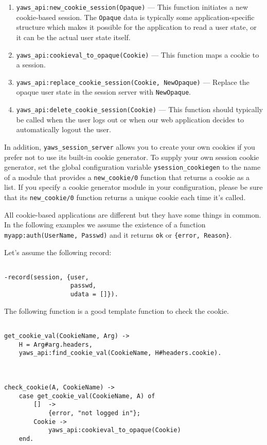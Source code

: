 \documentclass[11pt,oneside,english]{book}
\begin{document}
\begin{enumerate}
\item \verb+yaws_api:new_cookie_session(Opaque)+ --- This function
  initiates a new cookie-based session. The \verb+Opaque+ data is
  typically some application-specific structure which makes it
  possible for the application to read a user state, or it can be the
  actual user state itself.

\item \verb+yaws_api:cookieval_to_opaque(Cookie)+ --- This function
  maps a cookie to a session.

\item \verb+yaws_api:replace_cookie_session(Cookie, NewOpaque)+ ---
  Replace the opaque user state in the session server with
  \verb+NewOpaque+.

\item \verb+yaws_api:delete_cookie_session(Cookie)+ --- This function
  should typically be called when the user logs out or when our web
  application decides to automatically logout the user.

\end{enumerate}

In addition, \verb+yaws_session_server+ allows you to create your own
cookies if you prefer not to use its built-in cookie generator. To supply
your own session cookie generator, set the global configuration variable
\verb+ysession_cookiegen+ to the name of a module that provides a
\verb+new_cookie/0+ function that returns a cookie as a list. If you
specify a cookie generator module in your configuration, please be sure
that its \verb+new_cookie/0+ function returns a unique cookie each time
it's called.

All cookie-based applications are different but they have some things
in common. In the following examples we assume the existence of a
function \verb+myapp:auth(UserName, Passwd)+ and it returns \verb+ok+
or \verb+{error, Reason}+.

Let's assume the following record:

\begin{verbatim}

-record(session, {user,
                  passwd,
                  udata = []}).

\end{verbatim}

The following function is a good template function to check the
cookie.

\begin{verbatim}

get_cookie_val(CookieName, Arg) ->
    H = Arg#arg.headers,
    yaws_api:find_cookie_val(CookieName, H#headers.cookie).



check_cookie(A, CookieName) ->
    case get_cookie_val(CookieName, A) of
        []  ->
            {error, "not logged in"};
        Cookie ->
            yaws_api:cookieval_to_opaque(Cookie)
    end.

\end{verbatim}
\end{document}
